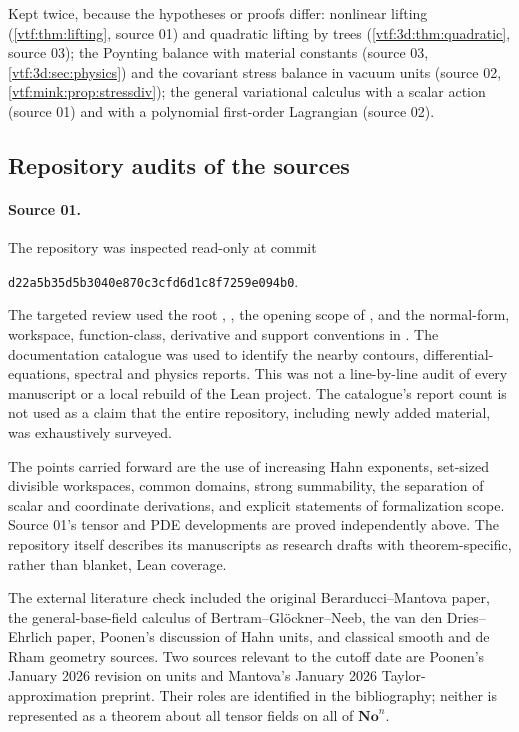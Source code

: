 \documentclass[11pt,letterpaper]{article}
\theoremstyle{definition}
\theoremstyle{remark}
\newcommand{\No}{\mathbf{No}}
\newcommand{\repoSHA}{d22a5b35d5b3040e870c3cfd6d1c8f7259e094b0}
\begin{document}
Kept twice, because the hypotheses or proofs differ: nonlinear lifting
(\cref{vtf:thm:lifting}, source 01) and quadratic lifting by trees
(\cref{vtf:3d:thm:quadratic}, source 03); the Poynting balance with material
constants (source 03, \cref{vtf:3d:sec:physics}) and the covariant stress balance
in vacuum units (source 02, \cref{vtf:mink:prop:stressdiv}); the general
variational calculus with a scalar action (source 01) and with a polynomial
first-order Lagrangian (source 02).

\subsection{Repository audits of the sources}

\paragraph{Source 01.}

The repository was inspected read-only at commit
\begin{center}\small\texttt{\repoSHA}.\end{center}
The targeted review used the root , ,
the opening scope of
, and the
normal-form, workspace, function-class, derivative and support conventions in
. The documentation catalogue was
used to identify the nearby contours, differential-equations, spectral and
physics reports. This was not a line-by-line audit of every manuscript or a
local rebuild of the Lean project. The catalogue's report count is not used
as a claim that the entire repository, including newly added material, was
exhaustively surveyed.

The points carried forward are the use of increasing Hahn exponents,
set-sized divisible workspaces, common domains, strong summability, the
separation of scalar and coordinate derivations, and explicit statements of
formalization scope. Source 01's tensor and PDE developments are
proved independently above. The repository itself describes its manuscripts
as research drafts with theorem-specific, rather than blanket, Lean coverage.

The external literature check included the original Berarducci--Mantova
paper, the general-base-field calculus of Bertram--Gl\"ockner--Neeb, the
van den Dries--Ehrlich paper, Poonen's discussion of Hahn units, and classical
smooth and de Rham geometry sources. Two sources relevant to the cutoff date
are Poonen's January 2026 revision on units and Mantova's January 2026
Taylor-approximation preprint. Their roles are identified in the bibliography;
neither is represented as a theorem about all tensor fields on all of
$\No^n$.
\end{document}
